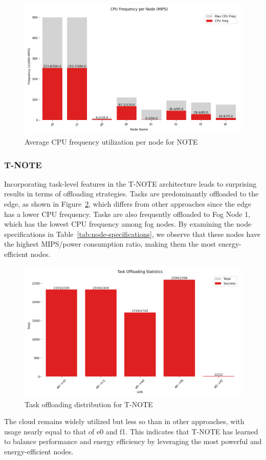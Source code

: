 \documentclass[preprint,3p,authoryear]{elsarticle}
\begin{document}
\begin{figure}[H]
    \centering
    \includegraphics[width=0.5\linewidth]{figs/NOTE/cpu_frequency_per_node.png}
    \caption{Average CPU frequency utilization per node for NOTE}
    \label{fig:NOTE-cpu-frequency}
\end{figure}


\subsubsection{T-NOTE}\label{subsubsec:T-NOTE-analysis}

Incorporating task-level features in the T-NOTE architecture leads to surprising results in terms of offloading strategies. Tasks are predominantly offloaded to the edge, as shown in Figure~\ref{fig:T-NOTE-offloading-stats}, which differs from other approaches since the edge has a lower CPU frequency. Tasks are also frequently offloaded to Fog Node 1, which has the lowest CPU frequency among fog nodes. By examining the node specifications in Table~\ref{tab:node-specifications}, we observe that these nodes have the highest MIPS/power consumption ratio, making them the most energy-efficient nodes.

\begin{figure}[H]
    \centering
    \includegraphics[width=0.5\linewidth]{figs/T-NOTE/task_offloading_statistics.png}
    \caption{Task offloading distribution for T-NOTE}
    \label{fig:T-NOTE-offloading-stats}
\end{figure}

The cloud remains widely utilized but less so than in other approaches, with usage nearly equal to that of e0 and f1. This indicates that T-NOTE has learned to balance performance and energy efficiency by leveraging the most powerful and energy-efficient nodes.
\end{document}
